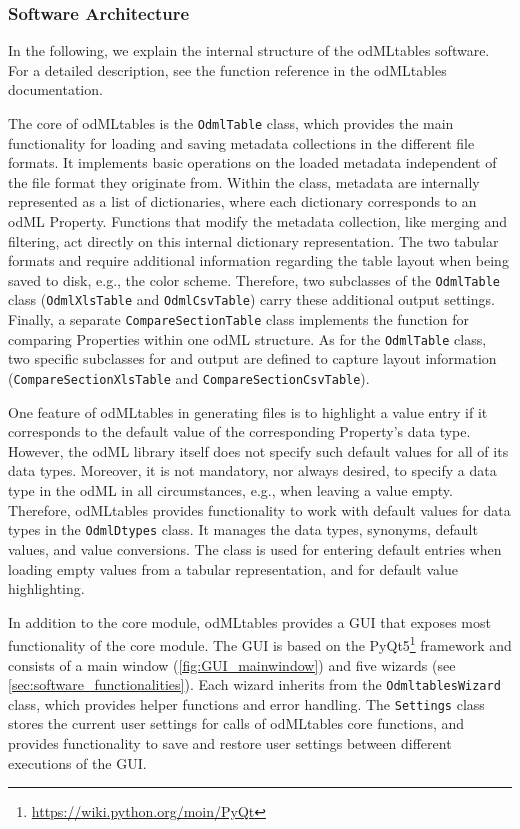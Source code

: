{\subsubsection{Software Architecture}
\label{sub:Software-Architecture}

In the following, we explain the internal structure of the odMLtables software. For a detailed description, see the function reference in the odMLtables documentation.

The core of odMLtables is the \texttt{OdmlTable} class, which provides the main functionality for loading and saving metadata collections in the different file formats. It implements basic operations on the loaded metadata independent of the file format they originate from. Within the class, metadata are internally represented as a list of dictionaries, where each dictionary corresponds to an odML Property. Functions that modify the metadata collection, like merging and filtering, act directly on this internal dictionary representation. The two tabular formats  and  require additional information regarding the table layout when being saved to disk, e.g., the color scheme. Therefore, two subclasses of the \texttt{OdmlTable} class (\texttt{OdmlXlsTable} and \texttt{OdmlCsvTable}) carry these additional output settings. Finally, a separate \texttt{CompareSectionTable} class implements the function for comparing Properties within one odML structure. As for the \texttt{OdmlTable} class, two specific subclasses for  and  output are defined to capture layout information (\texttt{CompareSectionXlsTable} and \texttt{CompareSectionCsvTable}).

One feature of odMLtables in generating  files is to highlight a value entry if it corresponds to the default value of the corresponding Property's data type. However, the odML library itself does not specify such default values for all of its data types. Moreover, it is not mandatory, nor always desired, to specify a data type in the odML in all circumstances, e.g., when leaving a value empty. Therefore, odMLtables provides functionality to work with default values for data types in the \texttt{OdmlDtypes} class. It manages the data types, synonyms, default values, and value conversions. The class is used for entering default entries when loading empty values from a tabular representation, and for default value highlighting.

In addition to the core module, odMLtables provides a GUI that exposes most functionality of the core module. The GUI is based on the PyQt5\footnote{\url{https://wiki.python.org/moin/PyQt}} framework and consists of a main window (\cref{fig:GUI_mainwindow}) and five wizards (see \cref{sec:software_functionalities}). Each wizard inherits from the \texttt{OdmltablesWizard} class, which provides helper functions and error handling. The \texttt{Settings} class stores the current user settings for calls of odMLtables core functions, and provides functionality to save and restore user settings between different executions of the GUI.


}
